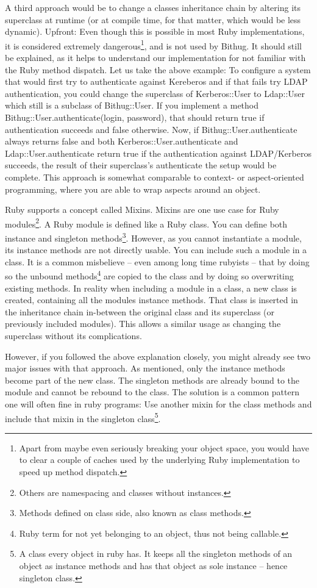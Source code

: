 \documentclass{llncs}
\begin{document}
A third approach would be to change a classes inheritance chain by altering its superclass at runtime (or at compile
time, for that matter, which would be less dynamic). Upfront: Even though this is possible in most Ruby implementations,
it is considered extremely dangerous\footnote{Apart from maybe even seriously breaking your object space, you would have
to clear a couple of caches used by the underlying Ruby implementation to speed up method dispatch.}, and is not used
by Bithug. It should still be explained, as it helps to understand our implementation for not familiar with the Ruby
method dispatch. Let us take the above example: To configure a system that would first try to authenticate against Kereberos
and if that fails try LDAP authentication, you could change the superclass of Kerberos::User to Ldap::User which still
is a subclass of Bithug::User. If you implement a method Bithug::User.authenticate(login, password), that should return
true if authentication succeeds and false otherwise. Now, if Bithug::User.authenticate always returns false and both
Kerberos::User.authenticate and Ldap::User.authenticate return true if the authentication against LDAP/Kerberos succeeds,
the result of their superclass's authenticate the setup would be complete. This approach is somewhat comparable to context-
or aspect-oriented programming, where you are able to wrap aspects around an object\cite{apel2006aspectual}.

Ruby supports a concept called Mixins\cite{apel2004using}. Mixins are one use case for Ruby modules\footnote{Others are namespacing
and classes without instances.}. A Ruby module is defined like a Ruby class. You can define both instance and singleton
methods\footnote{Methods defined on class side, also known as class methods.}. However, as you cannot instantiate a module,
its instance methods are not directly usable. You can include such a module in a class. It is a common misbelieve – even among
long time rubyists – that by doing so the unbound methods\footnote{Ruby term for not yet belonging to an object, thus not being
callable.} are copied to the class and by doing so overwriting existing methods. In reality when including a module in a class,
a new class is created, containing all the modules instance methods. That class is inserted in the inheritance chain in-between
the original class and its superclass (or previously included modules). This allows a similar usage as changing the superclass
without its complications.

However, if you followed the above explanation closely, you might already see two major issues with that approach. As mentioned,
only the instance methods become part of the new class. The singleton methods are already bound to the module and cannot be
rebound to the class. The solution is a common pattern one will often fine in ruby programs: Use another mixin for the class methods
and include that mixin in the singleton class\footnote{A class every object in ruby has. It keeps all the singleton methods of an
object as instance methods and has that object as sole instance – hence singleton class.}.
\end{document}
